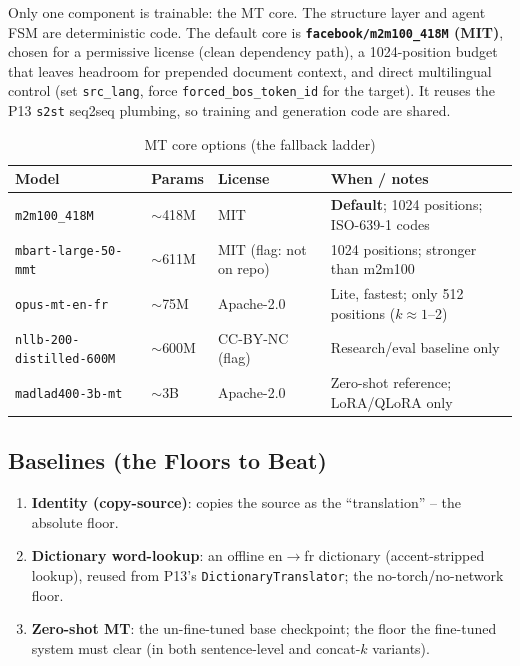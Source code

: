 \documentclass[12pt,a4paper]{article}
\begin{document}
Only one component is trainable: the MT core. The structure layer and agent FSM are deterministic code. The default core is \textbf{\texttt{facebook/m2m100\_418M} (MIT)}, chosen for a permissive license (clean dependency path), a 1024-position budget that leaves headroom for prepended document context, and direct multilingual control (set \texttt{src\_lang}, force \texttt{forced\_bos\_token\_id} for the target). It reuses the P13 \texttt{s2st} seq2seq plumbing, so training and generation code are shared.

\begin{table}[H]
\centering
\caption{MT core options (the fallback ladder)}
\small
\begin{tabularx}{\linewidth}{@{} l l l L @{}}
\toprule
\textbf{Model} & \textbf{Params} & \textbf{License} & \textbf{When / notes} \\
\midrule
\texttt{m2m100\_418M} & $\sim$418M & MIT & \textbf{Default}; 1024 positions; ISO-639-1 codes \\
\texttt{mbart-large-50-mmt} & $\sim$611M & MIT (flag: not on repo) & 1024 positions; stronger than m2m100 \\
\texttt{opus-mt-en-fr} & $\sim$75M & Apache-2.0 & Lite, fastest; only 512 positions ($k\approx1$--2) \\
\texttt{nllb-200-distilled-600M} & $\sim$600M & CC-BY-NC (flag) & Research/eval baseline only \\
\texttt{madlad400-3b-mt} & $\sim$3B & Apache-2.0 & Zero-shot reference; LoRA/QLoRA only \\
\bottomrule
\end{tabularx}
\end{table}

\subsection{Baselines (the Floors to Beat)}

\begin{enumerate}
  \item \textbf{Identity (copy-source)}: copies the source as the ``translation'' -- the absolute floor.
  \item \textbf{Dictionary word-lookup}: an offline en$\rightarrow$fr dictionary (accent-stripped lookup), reused from P13's \texttt{DictionaryTranslator}; the no-torch/no-network floor.
  \item \textbf{Zero-shot MT}: the un-fine-tuned base checkpoint; the floor the fine-tuned system must clear (in both sentence-level and concat-$k$ variants).
\end{enumerate}
\end{document}
